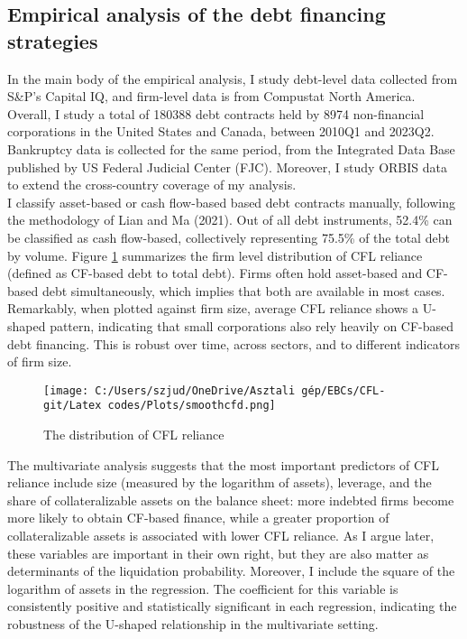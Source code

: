 \documentclass[12pt]{article}
\begin{document}
\subsection*{Empirical analysis of the debt financing strategies}
In the main body of the empirical analysis, I study debt-level data collected from S\&P's Capital IQ, and firm-level data is from Compustat North America. Overall, I study a total of 180388 debt contracts held by 8974 non-financial corporations in the United States and Canada, between 2010Q1 and 2023Q2. Bankruptcy data is collected for the same period, from the Integrated Data Base published by US Federal Judicial Center (FJC). Moreover, I study ORBIS data to extend the cross-country coverage of my analysis. \vspace{3mm} \\
I classify asset-based or cash flow-based based debt contracts manually, following the methodology of Lian and Ma (2021). Out of all debt instruments, 52.4\% can be classified as cash flow-based, collectively representing 75.5\% of the total debt by volume. Figure \ref{chart:CFLcdf} summarizes the firm level distribution of CFL reliance (defined as CF-based debt to total debt). Firms often hold asset-based and CF-based debt simultaneously, which implies that both are available in most cases. Remarkably, when plotted against firm size, average CFL reliance shows a U-shaped pattern, indicating that small corporations also rely heavily on CF-based debt financing. This is robust over time, across sectors, and to different indicators of firm size.

\begin{figure}[H]  %
    \centering
    \caption{The distribution of CFL reliance} \label{chart:CFLcdf}
    \texttt{[image: C:/Users/szjud/OneDrive/Asztali gép/EBCs/CFL-git/Latex codes/Plots/smoothcfd.png]}
\end{figure}
The multivariate analysis suggests that the most important predictors of CFL reliance include size (measured by the logarithm of assets), leverage, and the share of collateralizable assets on the balance sheet: more indebted firms become more likely to obtain CF-based finance, while a greater proportion of collateralizable assets is associated with lower CFL reliance. As I argue later, these variables are important in their own right, but they are also matter as determinants of the liquidation probability. Moreover, I include the square of the logarithm of assets in the regression. The coefficient for this variable is consistently positive and statistically significant in each regression, indicating the robustness of the U-shaped relationship in the multivariate setting. 
\end{document}
